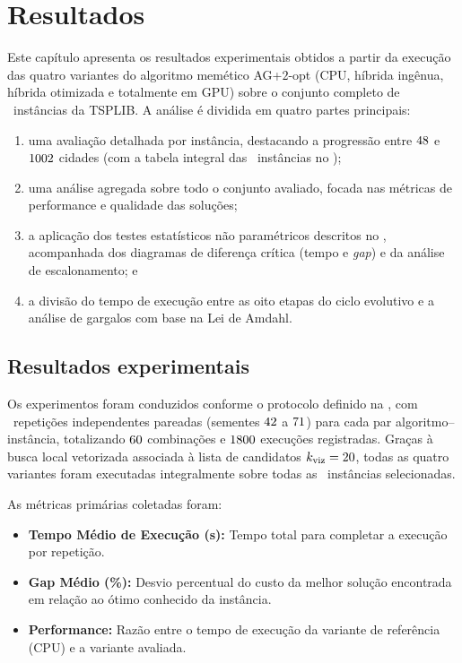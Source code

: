 \chapter{Resultados}\label{cap4-resultados}

Este capítulo apresenta os resultados experimentais obtidos a partir da execução das quatro variantes do algoritmo memético AG+\(2\)-opt (CPU, híbrida ingênua, híbrida otimizada e totalmente em GPU) sobre o conjunto completo de \totalinstancias\ instâncias da TSPLIB.
A análise é dividida em quatro partes principais:

\begin{enumerate}
  \item
        uma avaliação detalhada por instância, destacando a progressão entre \(48\) e \(1002\) cidades (com a tabela integral das \totalinstancias\ instâncias no );
  \item
        uma análise agregada sobre todo o conjunto avaliado, focada nas métricas de performance e qualidade das soluções;
  \item
        a aplicação dos testes estatísticos não paramétricos descritos no , acompanhada dos diagramas de diferença crítica (tempo e \emph{gap}) e da análise de escalonamento; e
  \item
        a divisão do tempo de execução entre as oito etapas do ciclo evolutivo e a análise de gargalos com base na Lei de Amdahl.
\end{enumerate}

\section{Resultados experimentais}\label{sec-41-resultados-experimentais}

Os experimentos foram conduzidos conforme o protocolo definido na , com \totalrepeticoes\ repetições independentes pareadas (sementes \(42\) a \(71\)) para cada par algoritmo--instância, totalizando \(60\) combinações e \(1800\) execuções registradas.
Graças à busca local vetorizada associada à lista de candidatos \(k_{\text{viz}} = 20\), todas as quatro variantes foram executadas integralmente sobre todas as \totalinstancias\ instâncias selecionadas.

As métricas primárias coletadas foram:

\begin{itemize}
  \item
        \textbf{Tempo Médio de Execução (s):} Tempo total para completar a execução por repetição.
  \item
        \textbf{Gap Médio (\%):} Desvio percentual do custo da melhor solução encontrada em relação ao ótimo conhecido da instância.
  \item
        \textbf{Performance:} Razão entre o tempo de execução da variante de referência (CPU) e a variante avaliada.
\end{itemize}

